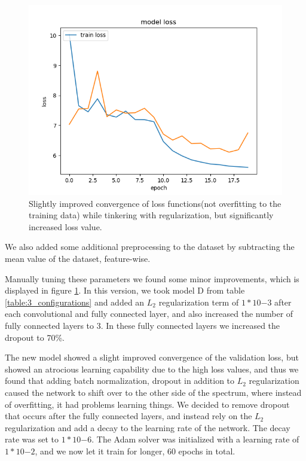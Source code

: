 \documentclass{kthreport}
\begin{document}
\begin{figure}
  \includegraphics[width=\linewidth]{../images/improved_loss_1.png}
  \caption[]
  {\small Slightly improved convergence of loss functions(not overfitting to the training data) while tinkering with regularization, but significantly increased loss value.}
  \label{fig:loss_improved_1}
\end{figure}
\FloatBarrier

We also added some additional preprocessing to the dataset by subtracting the mean value of the dataset, feature-wise.

Manually tuning these parameters we found some minor improvements, which is displayed in figure \ref{fig:loss_improved_1}. In this version, we took model D from table \ref{table:3_configurations} and added an $L_{2}$ regularization term of $1*10{-3}$ after each convolutional and fully connected layer, and also increased the number of fully connected layers to 3. In these fully connected layers we increased the dropout to 70\%.


The new model showed a slight improved convergence of the validation loss, but showed an atrocious learning capability due to the high loss values, and thus we found that adding batch normalization, dropout in addition to $L_{2}$ regularization caused the network to shift over to the other side of the spectrum, where instead of overfitting, it had problems learning things. We decided to remove dropout that occurs after the fully connected layers, and instead rely on the $L_{2}$ regularization and add a decay to the learning rate of the network. The decay rate was set to $1*10{-6}$. The Adam solver was initialized with a learning rate of $1*10{-2}$, and we now let it train for longer, 60 epochs in total.
\end{document}
